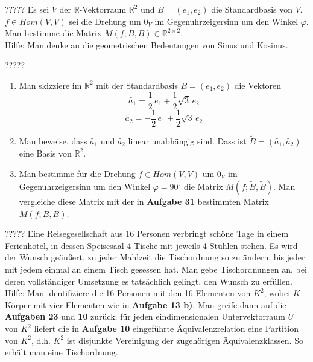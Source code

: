 \documentclass{uebblatt}
\begin{document}

\begin{aufgabe}{?????}
Es sei $V$ der $\mathbb{R}$-Vektorraum $\mathbb{R}^2$ und $B=(e_1, e_2)$ die Standardbasis von $V$. $f \in Hom(V, V)$ sei die Drehung um $0_V$ im Gegenuhrzeigersinn um den Winkel $\varphi$. Man bestimme die Matrix $M(f; B, B) \in \mathbb{R}^{2 \times 2}$.\\
Hilfe: Man denke an die geometrischen Bedeutungen von Sinus und Kosinus.
\end{aufgabe}


\begin{aufgabe}{?????}
\begin{enumerate}
\item Man skizziere im $\mathbb{R}^2$ mit der Standardbasis $B = (e_1, e_2)$ die Vektoren 
$$\tilde{a_1} = \frac{1}{2} \, e_1 + \frac{1}{2} \sqrt{3} \, e_2$$
$$\tilde{a_2} = -\frac{1}{2} \, e_1 + \frac{1}{2} \sqrt{3} \, e_2$$
\item Man beweise, dass $\tilde{a_1}$ und $\tilde{a_2}$ linear unabhängig sind. Dass ist $\widetilde{B} = (\tilde{a_1}, \tilde{a_2})$ eine Basis von $\mathbb{R}^2$.
\item Man bestimme für die Drehung $f \in Hom(V, V)$ um $0_V$ im Gegenuhrzeigersinn um den Winkel $\varphi = 90^{\circ}$ die Matrix $M(f; \widetilde{B}, \widetilde{B})$. Man vergleiche diese Matrix mit der in \textbf{Aufgabe 31} bestimmten Matrix $M(f; B, B)$.
\end{enumerate}
\end{aufgabe}


\begin{aufgabe}{?????}
Eine Reisegesellschaft aus 16 Personen verbringt schöne Tage in einem Ferienhotel, in dessen Speisesaal 4 Tische mit jeweils 4 Stühlen stehen. Es wird der Wunsch geäußert, zu jeder Mahlzeit die Tischordnung so zu ändern, bis jeder mit jedem einmal an einem Tisch gesessen hat. Man gebe Tischordnungen an, bei deren vollständiger Umsetzung es tatsächlich gelingt, den Wunsch zu erfüllen. \vspace{3mm} \\
Hilfe: Man identifiziere die 16 Personen mit den 16 Elementen von $K^2$, wobei $K$ Körper mit vier Elementen wie in \textbf{Aufgabe 13 b)}. Man greife dann auf die \textbf{Aufgaben 23} und \textbf{10} zurück; für jeden eindimensionalen Untervektorraum $U$ von $K^2$ liefert die in \textbf{Aufgabe 10} eingeführte Äquivalenzrelation eine Partition von $K^2$, d.h. $K^2$ ist disjunkte Vereinigung der zugehörigen Äquivalenzklassen. So erhält man eine Tischordnung.
\end{aufgabe}
\end{document}
